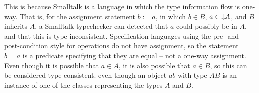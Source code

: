 This is because Smalltalk is a language in which the type information
flow is one-way. That is, for the assignment statement $b := a$, in
which $b \in B$, $a \in \mathord\downarrow A$, and $B$ inherits $A$, a Smalltalk
typechecker can detected that $a$ could possibly be in $A$, and that
this is type inconsistent. Specification languages using the pre- and
post-condition style for operations do not have assignment, so the
statement $b = a$ is a predicate specifying that they are equal -- not
a one-way assignment. Even though it is possible that $a \in A$, it is
also possible that $a \in B$, so this can be considered type
consistent. 
 even though an object $ab$ with type $AB$ is an instance of one of
the classes representing the types $A$ and $B$. 
